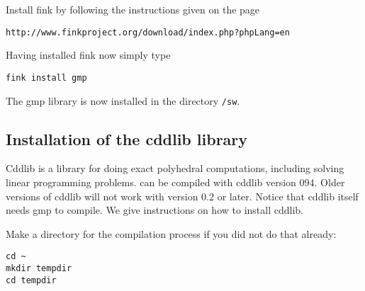 \noindent
Install fink by following the instructions given on the page

\centerline{\tt http://www.finkproject.org/download/index.php?phpLang=en}

\noindent
Having installed fink now simply type
\begin{verbatim}
fink install gmp
\end{verbatim}
The gmp library is now installed in the directory {\tt /sw}.

\subsection{Installation of the cddlib library}
Cddlib \cite{cdd} is a library for doing exact polyhedral
computations, including solving linear programming problems. \name can
be compiled with cddlib version 094. Older versions of cddlib will not
work with \name version 0.2 or later.
Notice that cddlib itself needs gmp to compile. We give
instructions on how to install cddlib.

\vspace{0.3cm}

\noindent
\color{red}
Make a directory for the compilation process if you did not do that already:
\begin{verbatim}
cd ~
mkdir tempdir
cd tempdir
\end{verbatim}

